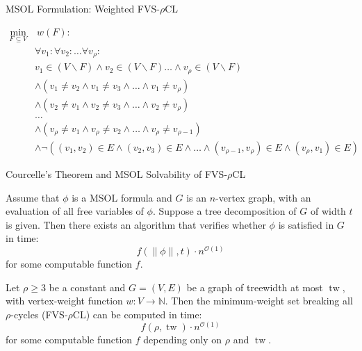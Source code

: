 \documentclass{beamer}
\newcommand{\tw}{\operatorname{tw}}
\begin{document}
\begin{frame}{MSOL Formulation: Weighted FVS-$\rho$CL}

\begin{equation}
    \label{courcelle:rho}
    \begin{aligned}
        \min_{F \subseteq V} & \ w(F) : \\
        & \forall v_1 : \forall v_2 : \dots \forall v_{\rho} : \\
        & v_1 \in (V \backslash F) \land v_2 \in (V \backslash F) \dots \land v_{\rho} \in (V \backslash F) \\
        & \land (v_1 \neq v_2 \land v_1 \neq v_3 \land \dots \land v_1 \neq v_{\rho}) \\
        & \land (v_2 \neq v_1 \land v_2 \neq v_3 \land \dots \land v_2 \neq v_{\rho}) \\
        & \dots \\
        & \land (v_{\rho} \neq v_1 \land v_{\rho} \neq v_2 \land \dots \land v_{\rho} \neq v_{\rho-1}) \\
        & \land \neg((v_1, v_2) \in E \land (v_2, v_3) \in E \land \dots \land (v_{\rho-1},v_{\rho}) \in E \land (v_{\rho}, v_1) \in E)
    \end{aligned}
\end{equation}

\end{frame}

\begin{frame}{Courcelle's Theorem and MSOL Solvability of FVS-$\rho$CL}
\footnotesize

\begin{theorem}
\label{theorem:courcelle}
Assume that $\phi$ is a MSOL formula and $G$ is an $n$-vertex graph, with an evaluation 
of all free variables of $\phi$. Suppose a tree decomposition of $G$ of width $t$ is given. 
Then there exists an algorithm that verifies whether $\phi$ is satisfied in $G$ in time:
\[
    f(\|\phi\|, t) \cdot n^{\mathcal{O}(1)}
\]
for some computable function $f$.
\end{theorem}

\begin{corollary}
\label{cor:msol-fvs-rho}
Let $\rho \ge 3$ be a constant and $G = (V,E)$ be a graph of treewidth at most $\tw$, with vertex-weight function $w : V \to \mathbb{N}$.
Then the minimum-weight set breaking all $\rho$-cycles (FVS-$\rho$CL) can be computed in time:
\[
    f(\rho, \tw) \cdot n^{\mathcal{O}(1)}
\]
for some computable function $f$ depending only on $\rho$ and $\tw$.
\end{corollary}

\end{frame}
\end{document}

